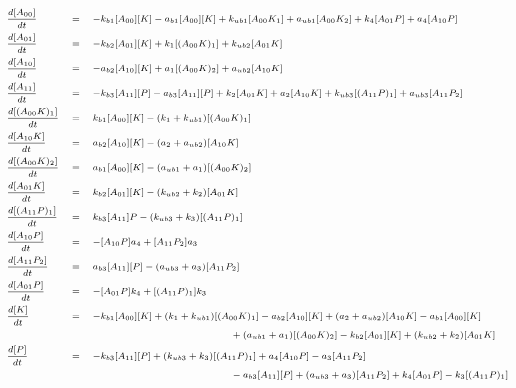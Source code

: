 \documentclass[9pt,lineno]{elife}
\begin{document}
\begin{appendixbox}
\begin{equation}
\scriptsize{    \begin{alignedat}{3}
        & \frac{d[A_{00}]}{dt} \quad &&= \quad -k_{b1}[A_{00}][K]-a_{b1}[A_{00}][K]+k_{ub1}[A_{00}K_1]+a_{ub1}[A_{00}K_2]+k_4[A_{01}P]+a_4[A_{10}P] && \\ 
        & \frac{d[A_{01}]}{dt} \quad &&= \quad -k_{b2}[A_{01}][K]+k_1[(A_{00}K)_1]+k_{ub2}[A_{01}K] && \\
        & \frac{d[A_{10}]}{dt} \quad &&= \quad -a_{b2}[A_{10}][K]+a_1[(A_{00}K)_2]+a_{ub2}[A_{10}K] && \\
        & \frac{d[A_{11}]}{dt} \quad &&= \quad -k_{b3}[A_{11}][P]-a_{b3}[A_{11}][P]+k_2[A_{01}K]+a_2[A_{10}K]+k_{ub3}[(A_{11}P)_1]+a_{ub3}[A_{11}P_2] && \\
        & \frac{d[(A_{00}K)_1]}{dt} \quad &&= \quad k_{b1}[A_{00}][K]-(k_1+k_{ub1})[(A_{00}K)_1] && \\ 
        & \frac{d[A_{10}K]}{dt} \quad &&= \quad a_{b2}[A_{10}][K]-(a_2+a_{ub2})[A_{10}K] && \\
        & \frac{d[(A_{00}K)_2]}{dt} \quad &&= \quad a_{b1}[A_{00}][K]-(a_{ub1}+a_1)[(A_{00}K)_2] && \\
        & \frac{d[A_{01}K]}{dt} \quad &&= \quad k_{b2}[A_{01}][K]-(k_{ub2}+k_2)[A_{01}K] && \\
        & \frac{d[(A_{11}P)_1]}{dt} \quad &&= \quad k_{b3}[A_{11}]P-(k_{ub3}+k_3)[(A_{11}P)_1] && \\
        & \frac{d[A_{10}P]}{dt} \quad &&= \quad -[A_{10}P]a_4+[A_{11}P_2]a_3 && \\
        & \frac{d[A_{11}P_2]}{dt} \quad &&= \quad a_{b3}[A_{11}][P]-(a_{ub3}+a_3)[A_{11}P_2] && \\
        & \frac{d[A_{01}P]}{dt} \quad &&= \quad -[A_{01}P]k_4+[(A_{11}P)_1]k_3 && \\ 
        & \frac{d[K]}{dt} \quad &&= \quad -k_{b1}[A_{00}][K]+(k_1+k_{ub1})[(A_{00}K)_1]-a_{b2}[A_{10}][K]+(a_2+a_{ub2})[A_{10}K] -a_{b1}[A_{00}][K]&& \\
        & && \hspace{45mm} +(a_{ub1}+a_1)[(A_{00}K)_2]-k_{b2}[A_{01}][K]+(k_{ub2}+k_2)[A_{01}K] && \\
        & \frac{d[P]}{dt} \quad &&= \quad -k_{b3}[A_{11}][P]+(k_{ub3}+k_3)[(A_{11}P)_1]+a_4[A_{10}P]-a_3[A_{11}P_2]  && \\
        & && \hspace{45mm} -a_{b3}[A_{11}][P]+(a_{ub3}+a_3)[A_{11}P_2]+k_4[A_{01}P]-k_3[(A_{11}P)_1]&& \\
    \end{alignedat}}
\end{equation}


\end{appendixbox}
\end{document}
